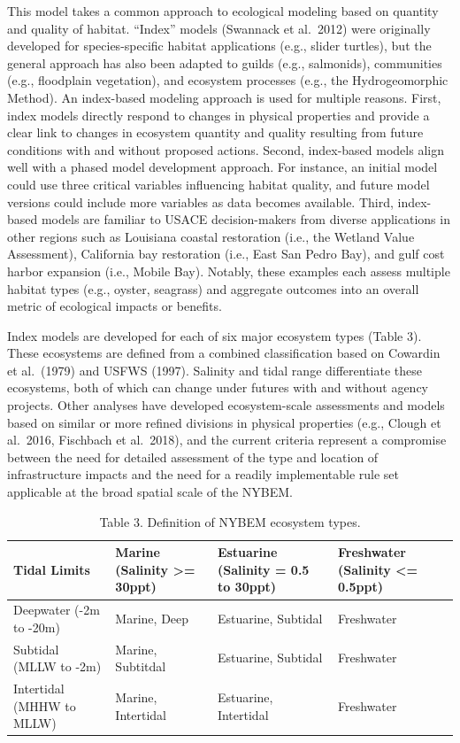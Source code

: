 \documentclass[
]{book}
\begin{document}
This model takes a common approach to ecological modeling based on quantity and quality of habitat. ``Index'' models (Swannack et al.~2012) were originally developed for species-specific habitat applications (e.g., slider turtles), but the general approach has also been adapted to guilds (e.g., salmonids), communities (e.g., floodplain vegetation), and ecosystem processes (e.g., the Hydrogeomorphic Method). An index-based modeling approach is used for multiple reasons. First, index models directly respond to changes in physical properties and provide a clear link to changes in ecosystem quantity and quality resulting from future conditions with and without proposed actions. Second, index-based models align well with a phased model development approach. For instance, an initial model could use three critical variables influencing habitat quality, and future model versions could include more variables as data becomes available. Third, index-based models are familiar to USACE decision-makers from diverse applications in other regions such as Louisiana coastal restoration (i.e., the Wetland Value Assessment), California bay restoration (i.e., East San Pedro Bay), and gulf cost harbor expansion (i.e., Mobile Bay). Notably, these examples each assess multiple habitat types (e.g., oyster, seagrass) and aggregate outcomes into an overall metric of ecological impacts or benefits.

Index models are developed for each of six major ecosystem types (Table 3). These ecosystems are defined from a combined classification based on Cowardin et al.~(1979) and USFWS (1997). Salinity and tidal range differentiate these ecosystems, both of which can change under futures with and without agency projects. Other analyses have developed ecosystem-scale assessments and models based on similar or more refined divisions in physical properties (e.g., Clough et al.~2016, Fischbach et al.~2018), and the current criteria represent a compromise between the need for detailed assessment of the type and location of infrastructure impacts and the need for a readily implementable rule set applicable at the broad spatial scale of the NYBEM.

\begin{table}

\caption{\label{tab:unnamed-chunk-5}Table 3. Definition of NYBEM ecosystem types.}
\centering
\begin{tabular}[t]{l|l|l|l}
\hline
Tidal Limits & Marine (Salinity >= 30ppt) & Estuarine (Salinity = 0.5 to 30ppt) & Freshwater (Salinity <= 0.5ppt)\\
\hline
Deepwater (-2m to -20m) & Marine, Deep & Estuarine, Subtidal & Freshwater\\
\hline
Subtidal (MLLW to -2m) & Marine, Subtitdal & Estuarine, Subtidal & Freshwater\\
\hline
Intertidal (MHHW to MLLW) & Marine, Intertidal & Estuarine, Intertidal & Freshwater\\
\hline
\end{tabular}
\end{table}
\end{document}
